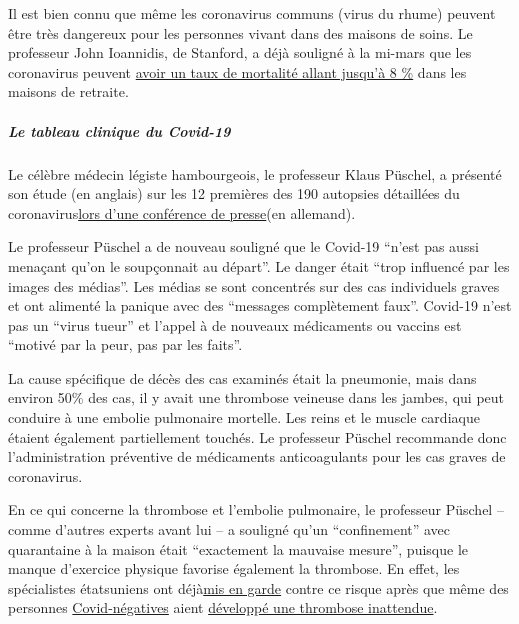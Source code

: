 Il est bien connu que même les coronavirus communs (virus du rhume)
peuvent être très dangereux pour les personnes vivant dans des maisons
de soins. Le professeur John Ioannidis, de Stanford, a déjà souligné à
la mi-mars que les coronavirus peuvent
\href{https://www.statnews.com/2020/03/17/a-fiasco-in-the-making-as-the-coronavirus-pandemic-takes-hold-we-are-making-decisions-without-reliable-data/}{avoir
un taux de mortalité allant jusqu'à 8 \%} dans les maisons de retraite.

\hypertarget{le-tableau-clinique-du-covid-19}{%
\subparagraph{\texorpdfstring{\textbf{Le tableau clinique du
Covid-19}}{Le tableau clinique du Covid-19}}\label{le-tableau-clinique-du-covid-19}}

Le célèbre médecin légiste hambourgeois, le professeur Klaus Püschel, a
présenté son étude (en anglais) sur les 12 premières des 190 autopsies
détaillées du
coronavirus\href{https://www.youtube.com/watch?v=GXhxorBBPYI}{lors d'une
conférence de presse}(en allemand).

Le professeur Püschel a de nouveau souligné que le Covid-19 ``n'est pas
aussi menaçant qu'on le soupçonnait au départ''. Le danger était ``trop
influencé par les images des médias''. Les médias se sont concentrés sur
des cas individuels graves et ont alimenté la panique avec des
``messages complètement faux''. Covid-19 n'est pas un ``virus tueur'' et
l'appel à de nouveaux médicaments ou vaccins est ``motivé par la peur,
pas par les faits''.

La cause spécifique de décès des cas examinés était la pneumonie, mais
dans environ 50\% des cas, il y avait une thrombose veineuse dans les
jambes, qui peut conduire à une embolie pulmonaire mortelle. Les reins
et le muscle cardiaque étaient également partiellement touchés. Le
professeur Püschel recommande donc l'administration préventive de
médicaments anticoagulants pour les cas graves de coronavirus.

En ce qui concerne la thrombose et l'embolie pulmonaire, le professeur
Püschel -- comme d'autres experts avant lui -- a souligné qu'un
``confinement'' avec quarantaine à la maison était ``exactement la
mauvaise mesure'', puisque le manque d'exercice physique favorise
également la thrombose. En effet, les spécialistes étatsuniens ont
déjà\href{https://twitter.com/AlexBerenson/status/1258625618431954945}{mis
en garde} contre ce risque après que même des personnes
\href{https://twitter.com/AlexBerenson/status/1259548620724080640}{Covid-négatives}
aient
\href{https://twitter.com/AlexBerenson/status/1259634922161147910}{développé
une thrombose inattendue}.

